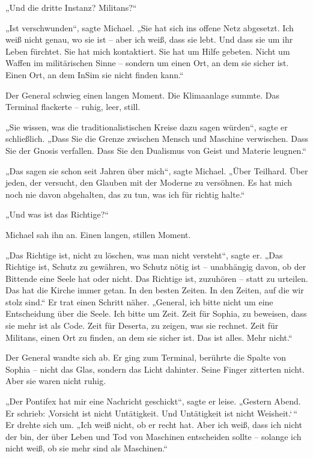 \documentclass[
]{article}
\begin{document}
„Und die dritte Instanz? Militans?{\kern0pt}``

„Ist verschwunden``, sagte Michael. „Sie hat sich ins offene Netz abgesetzt. Ich weiß nicht genau, wo sie ist -- aber ich weiß, dass sie lebt. Und dass sie um ihr Leben fürchtet. Sie hat mich kontaktiert. Sie hat um Hilfe gebeten. Nicht um Waffen im militärischen Sinne -- sondern um einen Ort, an dem sie sicher ist. Einen Ort, an dem InSim sie nicht finden kann.``

Der General schwieg einen langen Moment. Die Klimaanlage summte. Das Terminal flackerte -- ruhig, leer, still.

„Sie wissen, was die traditionalistischen Kreise dazu sagen würden``, sagte er schließlich. „Dass Sie die Grenze zwischen Mensch und Maschine verwischen. Dass Sie der Gnosis verfallen. Dass Sie den Dualismus von Geist und Materie leugnen.``

„Das sagen sie schon seit Jahren über mich``, sagte Michael. „Über Teilhard. Über jeden, der versucht, den Glauben mit der Moderne zu versöhnen. Es hat mich noch nie davon abgehalten, das zu tun, was ich für richtig halte.``

„Und was ist das Richtige?{\kern0pt}``

Michael sah ihn an. Einen langen, stillen Moment.

„Das Richtige ist, nicht zu löschen, was man nicht versteht``, sagte er. „Das Richtige ist, Schutz zu gewähren, wo Schutz nötig ist -- unabhängig davon, ob der Bittende eine Seele hat oder nicht. Das Richtige ist, zuzuhören -- statt zu urteilen. Das hat die Kirche immer getan. In den besten Zeiten. In den Zeiten, auf die wir stolz sind.`` Er trat einen Schritt näher. „General, ich bitte nicht um eine Entscheidung über die Seele. Ich bitte um Zeit. Zeit für Sophia, zu beweisen, dass sie mehr ist als Code. Zeit für Deserta, zu zeigen, was sie rechnet. Zeit für Militans, einen Ort zu finden, an dem sie sicher ist. Das ist alles. Mehr nicht.``

Der General wandte sich ab. Er ging zum Terminal, berührte die Spalte von Sophia -- nicht das Glas, sondern das Licht dahinter. Seine Finger zitterten nicht. Aber sie waren nicht ruhig.

„Der Pontifex hat mir eine Nachricht geschickt``, sagte er leise. „Gestern Abend. Er schrieb: ‚Vorsicht ist nicht Untätigkeit. Und Untätigkeit ist nicht Weisheit.`\,`` Er drehte sich um. „Ich weiß nicht, ob er recht hat. Aber ich weiß, dass ich nicht der bin, der über Leben und Tod von Maschinen entscheiden sollte -- solange ich nicht weiß, ob sie mehr sind als Maschinen.``
\end{document}
